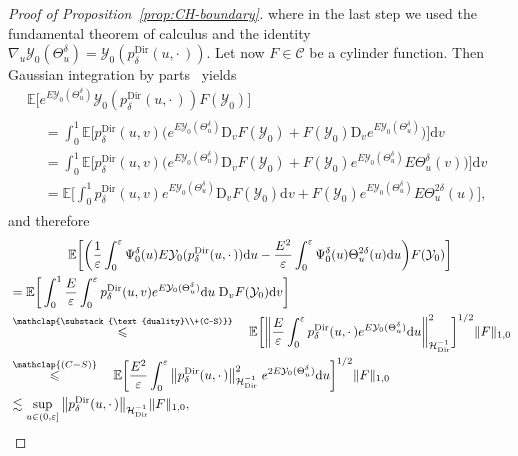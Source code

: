 \documentclass[AHL,Unicode,longabstracts]{cedram}
\DeclareMathOperator{\Dir}{Dir}
\newcommand{\bb}[1]{{\mathbb #1}}
\newcommand{\mc}[1]{{\mathcal #1}}
\renewcommand{\mc}[1]{{\mathcal #1}}
\newcommand{\mrD}{\mathrm{D}}
\renewcommand{\leq}{\leqslant}
\renewcommand{\le}{\leqslant}
\newcommand*{\dd}{\mathrm{d}}
\newcommand*{\du}{\dd u}
\newcommand*{\dv}{\dd v}
\begin{document}
\begin{proof}[Proof of Proposition~\ref{prop:CH-boundary}]
where in the last step we used the fundamental theorem of calculus and the identity $\nabla_u \mc Y_0(\Theta^\delta_u) = \mc Y_0(p^{\Dir}_\delta(u,\cdot\,))$. Let now $F \in \mc C$ be a cylinder function. Then Gaussian integration by parts~\cite[Lemma~1.2.1]{Nualart2006} yields
\begin{multline*}
\bb E\big[e^{E \mc Y_0(\Theta^\delta_u)} \mc Y_0(p^{\Dir}_\delta(u, \cdot\,)) F(\mc Y_0) \big] \\
\begin{aligned}
& = \int_0^1 \bb E\Big[p^{\Dir}_\delta(u,v) \big(e^{E \mc Y_0(\Theta^\delta_u)} \mrD_vF(\mc Y_0) + F(\mc Y_0) \mrD_v e^{E \mc Y_0(\Theta^\delta_u)} \big) \Big] \dv \\
& = \int_0^1 \bb E\Big[p^{\Dir}_\delta(u,v) \big(e^{E \mc Y_0(\Theta^\delta_u)} \mrD_vF(\mc Y_0) + F(\mc Y_0) e^{E \mc Y_0(\Theta^\delta_u)} E \Theta^\delta_u(v) \big) \Big] \dv \\
& = \bb E\bigg[\int_0^1 p^{\Dir}_\delta(u,v) e^{E \mc Y_0(\Theta^\delta_u)} \mrD_vF(\mc Y_0) \dv+ F(\mc Y_0) e^{E \mc Y_0(\Theta^\delta_u)} E \Theta^{2\delta}_u(u) \bigg],
\end{aligned}
\end{multline*}
and therefore
\begin{multline*}
\bb E\bigg[\bigg(\frac{1}{\varepsilon} \int_0^\varepsilon \Psi^\delta_0 (u) E \mc Y_0(p^{\Dir}_\delta(u,\cdot\,)) \du - \frac{E^2}{\varepsilon} \int_0^\varepsilon \Psi^\delta_0(u) \Theta^{2\delta}_u(u) \du\bigg) F(\mc Y_0) \bigg] \\
\begin{aligned}
&= \bb E\bigg[\int_0^1 \frac{E}{\varepsilon} \int_0^\varepsilon p^{\Dir}_\delta(u,v) e^{E \mc Y_0(\Theta^\delta_u)} \du\; \mrD_vF(\mc Y_0) \dv \bigg] \\
&\overset{\mathclap{\substack{\text{duality}\\+(C-S)}}}{\leq}\quad \bb E\bigg[\bigg\| \frac{E}{\varepsilon} \int_0^\varepsilon p^{\Dir}_\delta(u,\cdot\,) e^{E \mc Y_0(\Theta^\delta_u)} \du \bigg\|_{\mc H_{\Dir}^{- 1}}^2 \bigg]^{1/2} \| F\|_{1,0} \\
&\overset{\mathclap{(C-S)}} \le \quad \bb E\bigg[\frac{E^2}{\varepsilon} \int_0^\varepsilon \big\| p^{\Dir}_\delta(u,\cdot\,)\big\|_{\mc H_{\Dir}^{- 1}}^2 \; e^{2E \mc Y_0(\Theta^\delta_u)} \du \bigg]^{1/2} \| F\|_{1,0} \\
&\lesssim \sup_{u \in (0,\varepsilon]} \big\| p^{\Dir}_\delta(u,\cdot\,)\big\|_{\mc H_{\Dir}^{- 1}} \| F \|_{1,0},
\end{aligned}
\end{multline*}

\end{proof}
\end{document}
